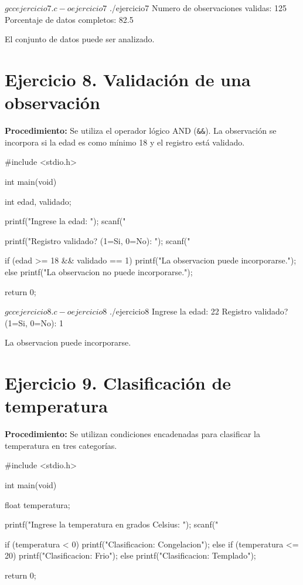 \documentclass[11pt, a4paper]{article}
\begin{document}
\begin{terminalout}
$ gcc ejercicio7.c -o ejercicio7
$ ./ejercicio7
Numero de observaciones validas: 125
Porcentaje de datos completos: 82.5

El conjunto de datos puede ser analizado.
\end{terminalout}

\newpage

\section*{Ejercicio 8. Validación de una observación}
\textbf{Procedimiento:} Se utiliza el operador lógico AND (\texttt{\&\&}). La observación se incorpora si la edad es como mínimo 18 y el registro está validado.

\begin{codebox}[title={CÓDIGO FUENTE EN C: Ejercicio 8}]
#include <stdio.h>

int main(void) {
    int edad, validado;

    printf("Ingrese la edad: ");
    scanf("%

    printf("Registro validado? (1=Si, 0=No): ");
    scanf("%

    if (edad >= 18 && validado == 1) {
        printf("La observacion puede incorporarse.\n");
    } else {
        printf("La observacion no puede incorporarse.\n");
    }

    return 0;
}
\end{codebox}

\begin{terminalout}
$ gcc ejercicio8.c -o ejercicio8
$ ./ejercicio8
Ingrese la edad: 22
Registro validado? (1=Si, 0=No): 1

La observacion puede incorporarse.
\end{terminalout}

\newpage

\section*{Ejercicio 9. Clasificación de temperatura}
\textbf{Procedimiento:} Se utilizan condiciones encadenadas para clasificar la temperatura en tres categorías.

\begin{codebox}[title={CÓDIGO FUENTE EN C: Ejercicio 9}]
#include <stdio.h>

int main(void) {
    float temperatura;

    printf("Ingrese la temperatura en grados Celsius: ");
    scanf("%

    if (temperatura < 0) {
        printf("Clasificacion: Congelacion\n");
    } else if (temperatura <= 20) {
        printf("Clasificacion: Frio\n");
    } else {
        printf("Clasificacion: Templado\n");
    }

    return 0;
}
\end{codebox}
\end{document}
